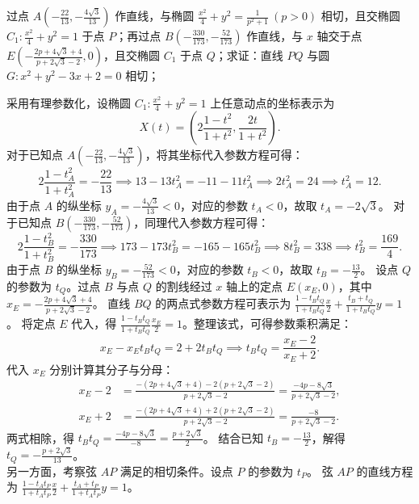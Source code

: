 \begin{example}
过点 \(A\left(-\frac{22}{13}, -\frac{4\sqrt{3}}{13}\right)\) 作直线，与椭圆 \(\frac{x^2}{4} + y^2 = \frac{1}{p^2 + 1}\ (p > 0)\) 相切，且交椭圆 \(C_1: \frac{x^2}{4} + y^2 = 1\) 于点 \(P\)；再过点 \(B\left(-\frac{330}{173}, -\frac{52}{173}\right)\) 作直线，与 \(x\) 轴交于点 \(E\left(-\frac{2p + 4\sqrt{3} + 4}{p + 2\sqrt{3} - 2}, 0\right)\)，且交椭圆 \(C_1\) 于点 \(Q\)；求证：直线 \(PQ\) 与圆 \(G: x^2 + y^2 - 3x + 2 = 0\) 相切；
\end{example}
\begin{solution}
采用有理参数化，设椭圆 $C_1: \frac{x^2}{4}+y^2=1$ 上任意动点的坐标表示为 
\[
X(t) = \left( 2\frac{1-t^2}{1+t^2}, \frac{2t}{1+t^2} \right).
\]
对于已知点 $A\left(-\frac{22}{13}, -\frac{4\sqrt{3}}{13}\right)$，将其坐标代入参数方程可得：
\[
2\frac{1-t_A^2}{1+t_A^2} = -\frac{22}{13} \implies 13 - 13t_A^2 = -11 - 11t_A^2 \implies 2t_A^2 = 24 \implies t_A^2 = 12.
\]
由于点 $A$ 的纵坐标 $y_A = -\frac{4\sqrt{3}}{13} < 0$，对应的参数 $t_A < 0$，故取 $t_A = -2\sqrt{3}$。
对于已知点 $B\left(-\frac{330}{173}, -\frac{52}{173}\right)$，同理代入参数方程可得：
\[
2\frac{1-t_B^2}{1+t_B^2} = -\frac{330}{173} \implies 173 - 173t_B^2 = -165 - 165t_B^2 \implies 8t_B^2 = 338 \implies t_B^2 = \frac{169}{4}.
\]
由于点 $B$ 的纵坐标 $y_B = -\frac{52}{173} < 0$，对应的参数 $t_B < 0$，故取 $t_B = -\frac{13}{2}$。
设点 $Q$ 的参数为 $t_Q$。过点 $B$ 与点 $Q$ 的割线经过 $x$ 轴上的定点 $E\left(x_E, 0\right)$，其中 $x_E = -\frac{2p + 4\sqrt{3} + 4}{p + 2\sqrt{3} - 2}$。
直线 $BQ$ 的两点式参数方程可表示为 $\frac{1-t_B t_Q}{1+t_B t_Q} \frac{x}{2} + \frac{t_B+t_Q}{1+t_B t_Q} y = 1$。
将定点 $E$ 代入，得 $\frac{1-t_B t_Q}{1+t_B t_Q} \frac{x_E}{2} = 1$。整理该式，可得参数乘积满足：
\[
x_E - x_E t_B t_Q = 2 + 2t_B t_Q \implies t_B t_Q = \frac{x_E - 2}{x_E + 2}.
\]
代入 $x_E$ 分别计算其分子与分母：
\begin{align*}
x_E - 2 &= \frac{-(2p + 4\sqrt{3} + 4) - 2(p + 2\sqrt{3} - 2)}{p + 2\sqrt{3} - 2} = \frac{-4p - 8\sqrt{3}}{p + 2\sqrt{3} - 2}, \\
x_E + 2 &= \frac{-(2p + 4\sqrt{3} + 4) + 2(p + 2\sqrt{3} - 2)}{p + 2\sqrt{3} - 2} = \frac{-8}{p + 2\sqrt{3} - 2}.
\end{align*}
两式相除，得 $t_B t_Q = \frac{-4p - 8\sqrt{3}}{-8} = \frac{p + 2\sqrt{3}}{2}$。
结合已知 $t_B = -\frac{13}{2}$，解得 $t_Q = -\frac{p + 2\sqrt{3}}{13}$。\\
另一方面，考察弦 $AP$ 满足的相切条件。设点 $P$ 的参数为 $t_P$。
弦 $AP$ 的直线方程为 $\frac{1-t_A t_P}{1+t_A t_P} \frac{x}{2} + \frac{t_A+t_P}{1+t_A t_P} y = 1$。

\end{solution}
